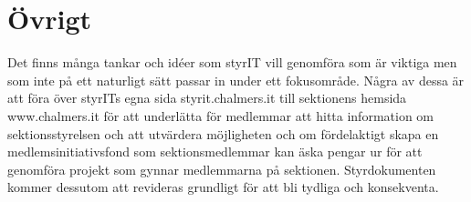 \documentclass[11pt, includeaddress]{classes/cthit}
\begin{document}
\section{Övrigt}
Det finns många tankar och idéer som styrIT vill genomföra som är viktiga men som inte på ett naturligt sätt passar in under ett fokusområde. Några av dessa är att föra över styrITs egna sida styrit.chalmers.it till sektionens hemsida www.chalmers.it för att underlätta för medlemmar att hitta information om sektionsstyrelsen och att utvärdera möjligheten och om fördelaktigt skapa en medlemsinitiativsfond som sektionsmedlemmar kan äska pengar ur för att genomföra projekt som gynnar medlemmarna på sektionen. Styrdokumenten kommer dessutom att revideras grundligt för att bli tydliga och konsekventa.
\end{document}
